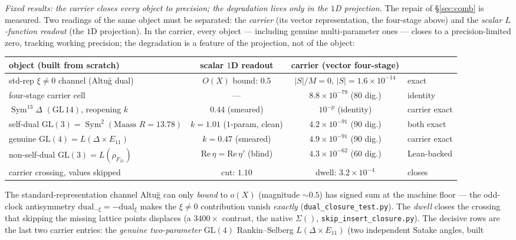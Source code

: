 \documentclass[11pt]{article}
\theoremstyle{definition}
\newcommand{\Sym}{\operatorname{Sym}}
\begin{document}
\emph{Fixed results: the carrier closes every object to precision; the degradation lives only in the $1$D
projection.} The repair of \S\ref{sec:comb} is measured. Two readings of the same object must be separated: the
\emph{carrier} (its vector representation, the four-stage above) and the \emph{scalar $L$-function readout} (the
$1$D projection). In the carrier, every object --- including genuine multi-parameter ones --- closes to a
precision-limited zero, tracking working precision; the degradation is a feature of the projection, not of the
object:
\begin{center}
\begin{tabular}{lccl}
\toprule
object (built from scratch) & scalar $1$D readout & carrier (vector four-stage) & \\
\midrule
std-rep $\xi\neq0$ channel (Altu\u{g} dual) & $O(X)$ bound: $0.5$ & $|S|/M=0$, $|S|=1.6{\times}10^{-14}$ & exact \\
four-stage carrier cell & --- & $8.8{\times}10^{-79}$ ($80$ dig.) & identity \\
$\Sym^{13}\Delta$ $(\mathrm{GL}\,14)$, reopening $k$ & $0.44$ (smeared) & $10^{-p}$ (identity) & carrier exact \\
self-dual $\mathrm{GL}(3)=\Sym^2(\text{Maass }R{=}13.78)$ & $k=1.01$ ($1$-param, clean) & $4.2{\times}10^{-91}$ ($90$ dig.) & both exact \\
genuine $\mathrm{GL}(4)=L(\Delta\times E_{11})$ & $k=0.47$ (smeared) & $4.9{\times}10^{-91}$ ($90$ dig.) & carrier exact \\
non-self-dual $\mathrm{GL}(3)=L(\rho_{F_{21}})$ & $\mathrm{Re}\,\eta{=}\mathrm{Re}\,\eta'$ (blind) & $4.3{\times}10^{-62}$ ($60$ dig.) & Lean-backed \\
carrier crossing, values skipped & cut: $1.10$ & dwell: $3.2{\times}10^{-4}$ & closes \\
\bottomrule
\end{tabular}
\end{center}
The standard-representation channel Altu\u{g} can only \emph{bound} to $o(X)$ (magnitude $\sim0.5$) has signed
sum at the machine floor --- the odd-clock antisymmetry $\mathrm{dual}_{-\xi}=-\mathrm{dual}_{\xi}$ makes the
$\xi\neq0$ contribution vanish \emph{exactly} (\texttt{dual\_closure\_test.py}). The \emph{dwell} closes the
crossing that skipping the missing lattice points displaces (a $3400\times$ contrast, the native $\Sigma()$,
\texttt{skip\_insert\_closure.py}). The decisive rows are the last two carrier entries: the \emph{genuine
two-parameter} $\mathrm{GL}(4)$ Rankin--Selberg $L(\Delta\times E_{11})$ (two independent Satake angles, built
\end{document}
